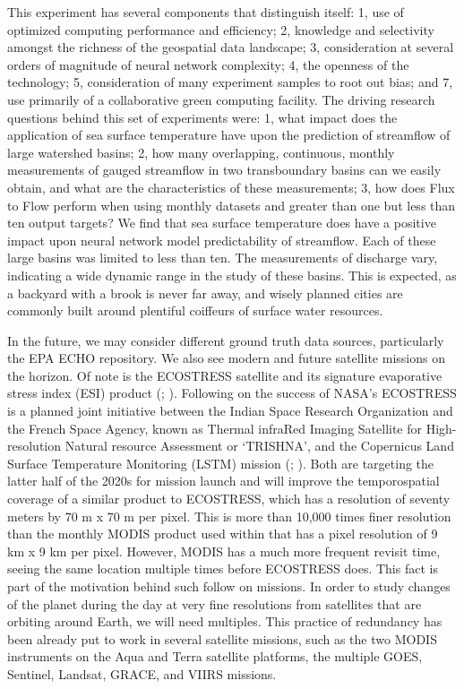 \begin{refsection}
This experiment has several components that distinguish itself: 1, use of optimized computing performance and efficiency; 2, knowledge and selectivity amongst the richness of the geospatial data landscape; 3, consideration at several orders of magnitude of neural network complexity; 4, the openness of the technology; 5, consideration of many experiment samples to root out bias; and 7, use primarily of a collaborative green computing facility. The driving research questions behind this set of experiments were: 1, what impact does the application of sea surface temperature have upon the prediction of streamflow of large watershed basins; 2, how many overlapping, continuous, monthly measurements of gauged streamflow in two transboundary basins can we easily obtain, and what are the characteristics of these measurements; 3, how does Flux to Flow perform when using monthly datasets and greater than one but less than ten output targets? We find that sea surface temperature does have a positive impact upon neural network model predictability of streamflow. Each of these large basins was limited to less than ten. The measurements of discharge vary, indicating a wide dynamic range in the study of these basins. This is expected, as a backyard with a brook is never far away, and wisely planned cities are commonly built around plentiful coiffeurs of surface water resources. 

In the future, we may consider different ground truth data sources, particularly the EPA ECHO repository. We also see modern and future satellite missions on the horizon. Of note is the ECOSTRESS satellite and its signature evaporative stress index (ESI) product (\cite{cawse2021ecostress}; \cite{fisher2020ecostress}). Following on the success of NASA’s ECOSTRESS is a planned joint initiative between the Indian Space Research Organization and the French Space Agency, known as Thermal infraRed Imaging Satellite for High-resolution Natural resource Assessment or ‘TRISHNA’, and the Copernicus Land Surface Temperature Monitoring (LSTM) mission (\cite{lagouarde2018indian}; \cite{koetz2018high}). Both are targeting the latter half of the 2020s for mission launch and will improve the temporospatial coverage of a similar product to ECOSTRESS, which has a resolution of seventy meters by 70 m x 70 m per pixel. This is more than 10,000 times finer resolution than the monthly MODIS product used within that has a pixel resolution of 9 km x 9 km per pixel. However, MODIS has a much more frequent revisit time, seeing the same location multiple times before ECOSTRESS does. This fact is part of the motivation behind such follow on missions. In order to study changes of the planet during the day at very fine resolutions from satellites that are orbiting around Earth, we will need multiples. This practice of redundancy has been already put to work in several satellite missions, such as the two MODIS instruments on the Aqua and Terra satellite platforms, the multiple GOES, Sentinel, Landsat, GRACE, and VIIRS missions.


\end{refsection}
